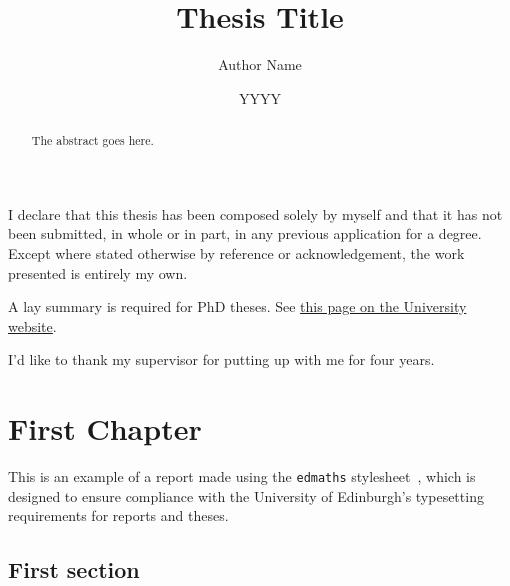 \documentclass[12pt,twoside]{report}
\title{Thesis Title}
\author{Author Name}
\date{YYYY}
\begin{document}
\flushbottom
{}

\maketitle

\begin{declaration}
	{I declare that this thesis has been composed solely by myself and that it has not been
	submitted, in whole or in part, in any previous application for a degree. Except where
	stated otherwise by reference or acknowledgement, the work presented is entirely my
	own.}
\end{declaration}

\begin{abstract}
	The abstract goes here.
\end{abstract}

\begin{laysummary}
	A lay summary is required for PhD theses. See \href{https://www.ed.ac.uk/sites/default/files/atoms/files/lay_summary_in_theses.pdf}{this page on the University website}.
\end{laysummary}

\dedication{In memory of my sanity.}

\begin{acknowledgements}
	I'd like to thank my supervisor for putting up with me for four years.
\end{acknowledgements}


\tableofcontents

\newpage
{}

\chapter{First Chapter}

This is an example of a report made using the \texttt{edmaths} stylesheet~\cite{koeppe2007}, which is designed to ensure compliance with the University of Edinburgh's typesetting requirements for reports and theses.

\section{First section}
\end{document}
